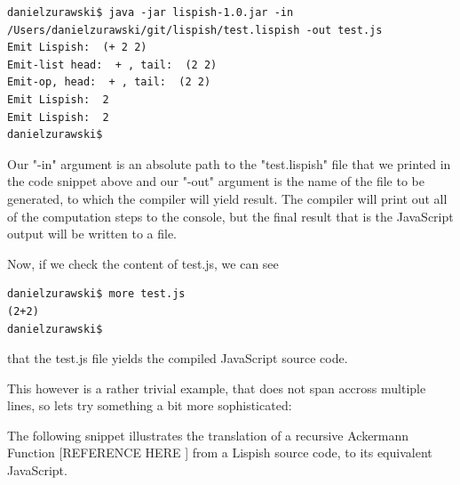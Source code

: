 \begin{verbatim}
danielzurawski$ java -jar lispish-1.0.jar -in /Users/danielzurawski/git/lispish/test.lispish -out test.js
Emit Lispish:  (+ 2 2)
Emit-list head:  + , tail:  (2 2)
Emit-op, head:  + , tail:  (2 2)
Emit Lispish:  2
Emit Lispish:  2
danielzurawski$
\end{verbatim}

Our "-in" argument is an absolute path to the "test.lispish" file that we printed in the code snippet above and our "-out" argument is the name of the file to be generated, to which the compiler will yield result. 
The compiler will print out all of the computation steps to the console, but the final result that is the JavaScript output will be written to a file.

Now, if we check the content of test.js, we can see
\begin{verbatim}
danielzurawski$ more test.js
(2+2)
danielzurawski$
\end{verbatim}
that the test.js file yields the compiled JavaScript source code. 

This however is a rather trivial example, that does not span accross multiple lines, so lets try something a bit more sophisticated:

The following snippet illustrates the translation of a recursive Ackermann Function [REFERENCE HERE ] from a Lispish source code, to its equivalent JavaScript. 

